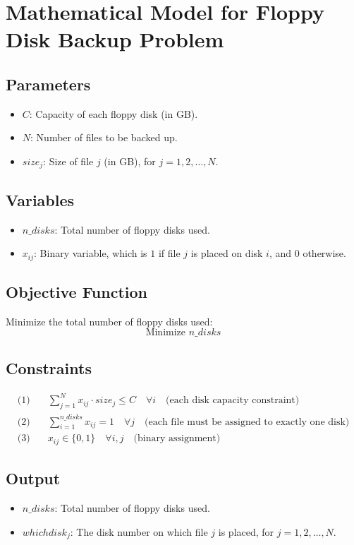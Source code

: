 \documentclass{article}
\begin{document}
\section*{Mathematical Model for Floppy Disk Backup Problem}

\subsection*{Parameters}
\begin{itemize}
    \item $C$: Capacity of each floppy disk (in GB).
    \item $N$: Number of files to be backed up.
    \item $size_j$: Size of file $j$ (in GB), for $j = 1, 2, \ldots, N$.
\end{itemize}

\subsection*{Variables}
\begin{itemize}
    \item $n\_disks$: Total number of floppy disks used.
    \item $x_{ij}$: Binary variable, which is $1$ if file $j$ is placed on disk $i$, and $0$ otherwise.
\end{itemize}

\subsection*{Objective Function}
Minimize the total number of floppy disks used:
\[
\text{Minimize } n\_disks
\]

\subsection*{Constraints}
\begin{align*}
\text{(1)} & \quad \sum_{j=1}^{N} x_{ij} \cdot size_j \leq C \quad \forall i \quad \text{(each disk capacity constraint)} \\
\text{(2)} & \quad \sum_{i=1}^{n\_disks} x_{ij} = 1 \quad \forall j \quad \text{(each file must be assigned to exactly one disk)} \\
\text{(3)} & \quad x_{ij} \in \{0, 1\} \quad \forall i, j \quad \text{(binary assignment)}
\end{align*}

\subsection*{Output}
\begin{itemize}
    \item $n\_disks$: Total number of floppy disks used.
    \item $whichdisk_j$: The disk number on which file $j$ is placed, for $j = 1, 2, \ldots, N$.
\end{itemize}
\end{document}
